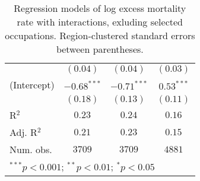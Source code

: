 \begin{table}
\begin{center}
\begin{tabular}{l c c c}
                                 & $(0.04)$      & $(0.04)$      & $(0.03)$      \\
(Intercept)                      & $-0.68^{***}$ & $-0.71^{***}$ & $0.53^{***}$  \\
                                 & $(0.18)$      & $(0.13)$      & $(0.11)$      \\
\hline
R$^2$                            & $0.23$        & $0.24$        & $0.16$        \\
Adj. R$^2$                       & $0.21$        & $0.23$        & $0.15$        \\
Num. obs.                        & $3709$        & $3709$        & $4881$        \\
\hline
\multicolumn{4}{l}{\scriptsize{$^{***}p<0.001$; $^{**}p<0.01$; $^{*}p<0.05$}}
\end{tabular}
\caption{Regression models of log excess mortality rate with interactions, exluding selected occupations. Region-clustered standard errors between parentheses.}
\label{tab:intermodels}
\end{center}
\end{table}

